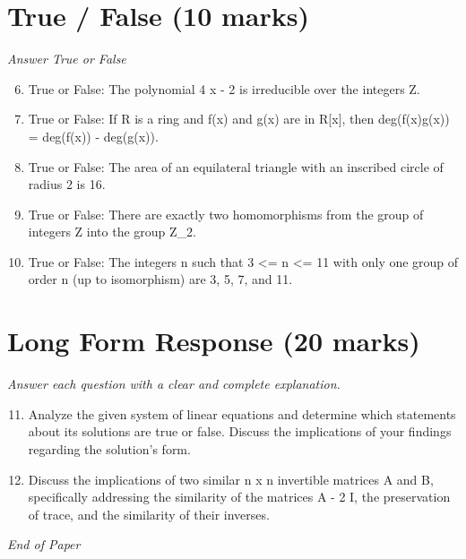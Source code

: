 \documentclass[12pt]{article}
\begin{document}
\section*{True / False (10 marks)}
\textit{Answer True or False}
\begin{enumerate}[label=\arabic*.]
\setcounter{enumi}{5}
\item True or False: The polynomial 4 x - 2 is irreducible over the integers Z.
\item True or False: If R is a ring and f(x) and g(x) are in R[x], then deg(f(x)g(x)) = deg(f(x)) - deg(g(x)).
\item True or False: The area of an equilateral triangle with an inscribed circle of radius 2 is 16.
\item True or False: There are exactly two homomorphisms from the group of integers Z into the group Z\_2.
\item True or False: The integers n such that 3 \textless{}= n \textless{}= 11 with only one group of order n (up to isomorphism) are 3, 5, 7, and 11.
\end{enumerate}

\section*{Long Form Response (20 marks)}
\textit{Answer each question with a clear and complete explanation.}
\begin{enumerate}[label=\arabic*.]
\setcounter{enumi}{10}
\item Analyze the given system of linear equations and determine which statements about its solutions are true or false. Discuss the implications of your findings regarding the solution's form.
\item Discuss the implications of two similar n x n invertible matrices A and B, specifically addressing the similarity of the matrices A - 2 I, the preservation of trace, and the similarity of their inverses.
\end{enumerate}

\vfill
\noindent\textit{End of Paper}
\end{document}
